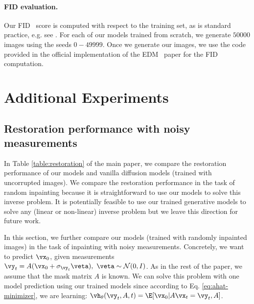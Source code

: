 \documentclass{article}
\begin{document}
\paragraph{FID evaluation.}
Our FID~\citep{fid} score is computed with respect to the training set, as is standard practice, e.g. see \citep{ddpm, karras2022elucidating, ncsnv3}. For each of our models trained from scratch, we generate $50000$ images using the seeds $0-49999$. Once we generate our images, we use the code provided in the official implementation of the EDM~\citep{karras2022elucidating} paper for the FID computation.





















\section{Additional Experiments}
\label{sec:additional_experiments}
\subsection{Restoration performance with noisy measurements}

In Table \ref{table:restoration} of the main paper, we compare the restoration performance of our models and vanilla diffusion models (trained with uncorrupted images). We compare the restoration performance in the task of random inpainting because it is straightforward to use our models to solve this inverse problem. It is potentially feasible to use our trained generative models to solve any (linear or non-linear) inverse problem but we leave this direction for future work.

In this section, we further compare our models (trained with randomly inpainted images) in the task of inpainting with noisy measurements. Concretely, we want to predict $\vx_0$, given measurements $\vy_t = A(\vx_0 + \sigma_{\vy_t}\veta), \ \veta \sim \mathcal N(0, I)$. As in the rest of the paper, we assume that the mask matrix $A$ is known. We can solve this problem with one model prediction using our trained models since according to Eq. \ref{eq:ahat-minimizer}, we are learning: $\vh_{\theta}(\vy_t, A, t) = \E[\vx_0| A\vx_t=\vy_t, A]$. 
\end{document}
